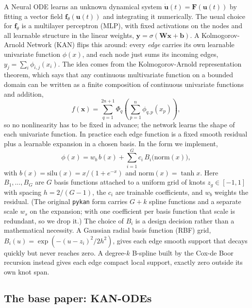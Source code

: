 A Neural ODE \cite{chen2018neuralode} learns an unknown dynamical system
$\dot{\mathbf{u}}(t) = \mathbf{F}(\mathbf{u}(t))$ by fitting a vector field
$\mathbf{f}_\theta(\mathbf{u}(t))$ and integrating it numerically. The usual
choice for $\mathbf{f}_\theta$ is a multilayer perceptron (MLP), with fixed
activations on the nodes and all learnable structure in the linear weights,
$\mathbf{y} = \sigma(\mathbf{W}\mathbf{x}+\mathbf{b})$. A Kolmogorov-Arnold
Network (KAN) \cite{liu2024kan} flips this around: every \emph{edge} carries
its own learnable univariate function $\phi(x)$, and each node just sums its
incoming edges, $y_j = \sum_i \phi_{i,j}(x_i)$. The idea comes from the
Kolmogorov-Arnold representation theorem, which says that any continuous
multivariate function on a bounded domain can be written as a finite
composition of continuous univariate functions and addition,
\begin{equation}
f(\mathbf{x}) = \sum_{q=1}^{2n+1}\Phi_q\!\left(\sum_{p=1}^{n}\phi_{q,p}(x_p)\right),
\label{eq:kolmogorov-arnold}
\end{equation}
so no nonlinearity has to be fixed in advance; the network learns the shape
of each univariate function. In practice each edge function is a fixed
smooth residual plus a learnable expansion in a chosen basis. In the form we
implement,
\begin{equation}
\phi(x) = w_b\, b(x) + \sum_{i=1}^{G} c_i\, B_i\big(\mathrm{norm}(x)\big),
\label{eq:kan-edge}
\end{equation}
with $b(x)=\mathrm{silu}(x) = x/(1+e^{-x})$ and $\mathrm{norm}(x)=\tanh x$.
Here $B_1,\dots,B_G$ are $G$ basis functions attached to a uniform grid of
knots $z_g\in[-1,1]$ with spacing $h=2/(G-1)$, the $c_i$ are trainable
coefficients, and $w_b$ weights the residual. (The original \texttt{pykan}
form carries $G+k$ spline functions and a separate scale $w_s$ on the
expansion; with one coefficient per basis function that scale is redundant,
so we drop it.) The choice of $B_i$ is a design decision rather than a
mathematical necessity. A Gaussian radial basis function (RBF) grid,
$B_i(u)=\exp(-(u-z_i)^2/2h^2)$, gives each edge smooth support that decays
quickly but never reaches zero. A degree-$k$ B-spline built by the
Cox-de Boor recursion instead gives each edge compact local support, exactly
zero outside its own knot span.

\subsection{The base paper: KAN-ODEs}
\label{sec:base-paper}

